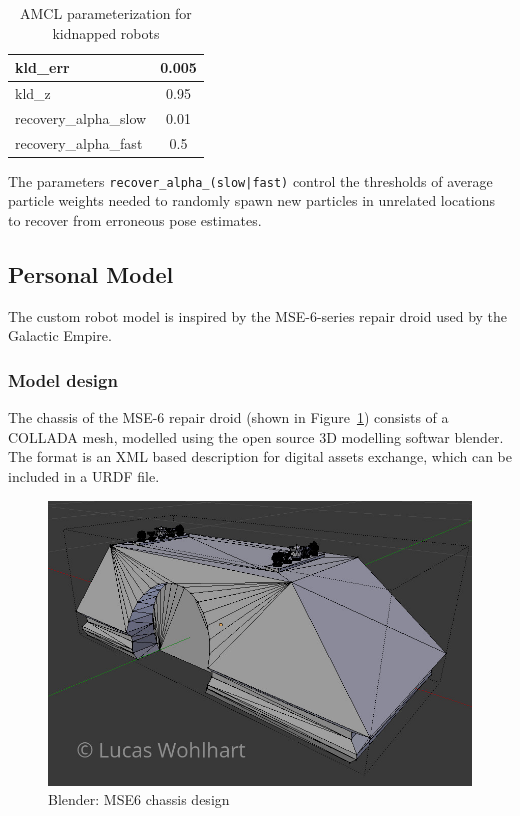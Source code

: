 \documentclass[10pt,journal,compsoc]{IEEEtran}
\begin{document}
\begin{table}[h]
      \caption{AMCL parameterization for kidnapped robots}
      \label{tab:amcl_parameterization}
      \begin{center}
            \begin{tabular}{|l|c|}  \hline
      kld\_err & 0.005 \\ \hline
      kld\_z & 0.95\\ \hline
      recovery\_alpha\_slow & 0.01  \\ \hline
      recovery\_alpha\_fast & 0.5  \\ \hline
      \end{tabular}
\end{center}
\end{table}        
The parameters \texttt{recover\_alpha\_(slow|fast)} control the thresholds of average particle weights needed to randomly spawn new particles in unrelated locations to recover from erroneous pose estimates.

\subsection{Personal Model}
The custom robot model is inspired by the MSE-6-series repair droid\cite{MSE-6-series-droid} used by the Galactic Empire. 
\subsubsection{Model design}
The chassis of the MSE-6 repair droid (shown in Figure~\ref{fig:blender_design_mse6}) consists of a COLLADA mesh, modelled using the open source 3D modelling softwar blender\cite{Blender}. The format is an XML based description for digital assets exchange, which can be included in a URDF file.

\begin{figure}[thpb]
      \centering
      \includegraphics[width=\linewidth]{img/blender_mse6_chassis}
      \caption{Blender: MSE6 chassis design}
      \label{fig:blender_design_mse6}
\end{figure}
\end{document}
